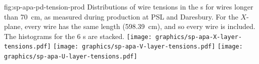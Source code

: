 

\begin{dunefigure}{fig:sp-apa-pd-tension-prod}
{Distributions of wire tensions in the  s for wires longer than \SI{70}{cm}, as measured during production at PSL and Daresbury. For the $X$-plane, every wire has the same length (\SI{598.39}{cm}), and so every wire is included. %
The histograms for the 6 s are stacked. %
}
\texttt{[image: graphics/sp-apa-X-layer-tensions.pdf]}
\texttt{[image: graphics/sp-apa-V-layer-tensions.pdf]}
\texttt{[image: graphics/sp-apa-U-layer-tensions.pdf]}
\end{dunefigure}


